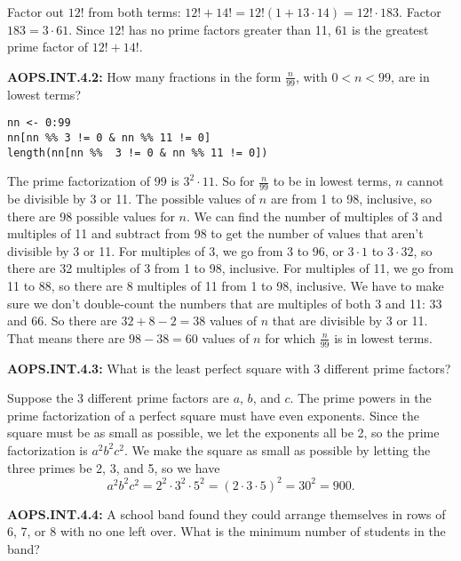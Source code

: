 \documentclass[11pt]{article}
\newenvironment{uzdevums}[1][\unskip]{%
\vspace{3mm}
\noindent
\textbf{#1:}
\noindent}
{}
\begin{document}
Factor out $12!$ from both terms: $12!+14!=12!(1+13\cdot 14)=12!\cdot 183$. Factor $183=3\cdot 61$. Since $12!$ has no prime factors greater than 11, $\boxed{61}$ is the greatest prime factor of $12!+14!$.

\begin{uzdevums}[AOPS.INT.4.2]
How many fractions in the form $\frac{n}{99}$, with $0<n<99$, are in lowest terms?
\end{uzdevums}


\begin{verbatim}
nn <- 0:99
nn[nn %% 3 != 0 & nn %% 11 != 0]
length(nn[nn %%  3 != 0 & nn %% 11 != 0])
\end{verbatim}

The prime factorization of 99 is $3^2\cdot11$. So for $\frac{n}{99}$ to be in lowest terms, $n$ cannot be divisible by 3 or 11. The possible values of $n$ are from 1 to 98, inclusive, so there are 98 possible values for $n$. We can find the number of multiples of 3 and multiples of 11 and subtract from 98 to get the number of values that aren't divisible by 3 or 11. For multiples of 3, we go from 3 to 96, or $3\cdot1$ to $3\cdot32$, so there are 32 multiples of 3 from 1 to 98, inclusive. For multiples of 11, we go from 11 to 88, so there are 8 multiples of 11 from 1 to 98, inclusive. We have to make sure we don't double-count the numbers that are multiples of both 3 and 11: 33 and 66. So there are $32+8-2=38$ values of $n$ that are divisible by 3 or 11. That means there are $98-38=\boxed{60}$ values of $n$ for which $\frac{n}{99}$ is in lowest terms.


\begin{uzdevums}[AOPS.INT.4.3]
What is the least perfect square with 3 different prime factors?
\end{uzdevums}

Suppose the 3 different prime factors are $a$, $b$, and $c$. The prime powers in the prime factorization of a perfect square must have even exponents. Since the square must be as small as possible, we let the exponents all be 2, so the prime factorization is $a^2b^2c^2$. We make the square as small as possible by letting the three primes be 2, 3, and 5, so we have \[a^2b^2c^2 = 2^2\cdot 3^2 \cdot 5^2 = (2\cdot 3\cdot 5)^2 = 30^2 =\boxed{900}.\]


\begin{uzdevums}[AOPS.INT.4.4]
A school band found they could arrange themselves in rows of 6, 7, or 8 with no one left over. What is the minimum number of students in the band?
\end{uzdevums}
\end{document}
